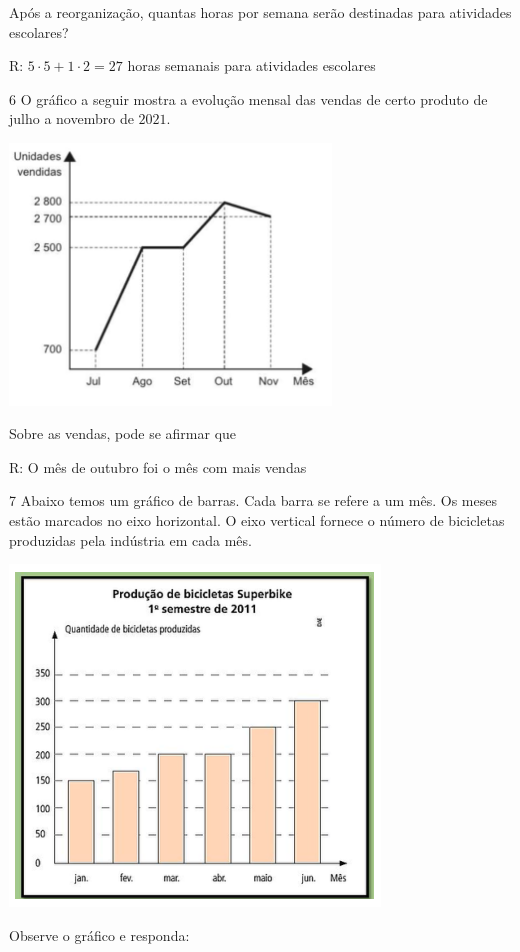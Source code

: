 Após a reorganização, quantas horas por semana serão destinadas para
atividades escolares?

R: $5·5 + 1·2 = 27$ horas semanais para atividades escolares

\num{6}  O gráfico a seguir mostra a evolução mensal das vendas de certo
produto de julho a novembro de $2021$.

\includegraphics[width=3.36458in,height=2.73558in]{./imgSAEB_6_MAT/media/image84.png}

Sobre as vendas, pode se afirmar que

R: O mês de outubro foi o mês com mais vendas

\num{7}  Abaixo temos um gráfico de barras. Cada barra se refere a um mês. Os
meses estão marcados no eixo horizontal. O eixo vertical fornece o
número de bicicletas produzidas pela indústria em cada mês.

\includegraphics[width=3.875in,height=3.57292in]{./imgSAEB_6_MAT/media/image85.png}

Observe o gráfico e responda:

